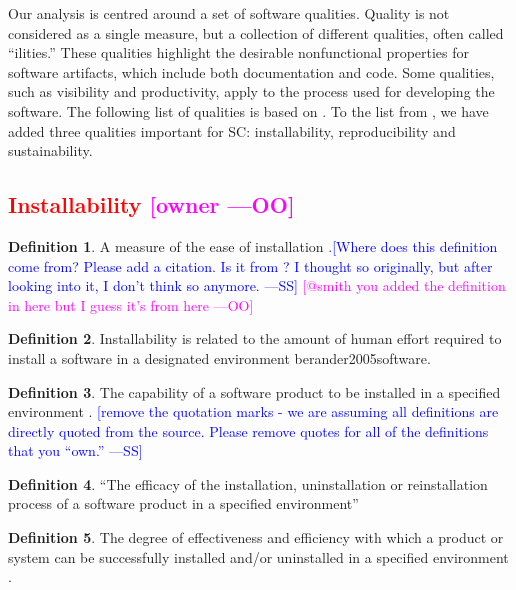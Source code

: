 \documentclass[letterpaper,cleveref]{lipics-v2019}
\newcommand{\authornote}[3]{\textcolor{#1}{[#3 ---#2]}}
\newcommand{\authornote}[3]{}
\newcommand{\wss}[1]{\authornote{blue}{SS}{#1}} %
\newcommand{\oo}[1]{\authornote{magenta}{OO}{#1}} %
\newcommand{\notdone}[1]{\textcolor{red}{#1}}
\theoremstyle{definition}
\newtheorem{defn}{Definition}
\begin{document}
Our analysis is centred around a set of software qualities.  Quality is not
considered as a single measure, but a collection of different qualities, often
called ``ilities.''  These qualities highlight the desirable nonfunctional
properties for software artifacts, which include both documentation and
code. Some qualities, such as visibility and productivity, apply to the process
used for developing the software. The following list of qualities is based on
\cite{GhezziEtAl2003}. To the list from \cite{GhezziEtAl2003}, we have added
three qualities important for SC: installability, reproducibility and
sustainability.

\subsection{\notdone{Installability} \oo{owner}}

\begin{defn}
	A measure of the ease of installation \citep{smith2015comparing}.\wss{Where
	does this definition come from? Please add a citation.  Is it from
	\citet{McCallEtAl1977}? I thought so originally, but after looking into it, I
	don't think so anymore.}
	\oo{@smith you added the definition in here but I guess it's from here}
\end{defn}

\begin{defn}
	Installability is related to the amount of human effort required to install a
	software in a designated environment \citep{iso2001iec}
		{ berander2005software}.
\end{defn}

\begin{defn}
	The capability of a software product to be installed in a specified
	environment \citep{berander2005software}.  \wss{remove the quotation marks -
		we are assuming all definitions are directly quoted from the source.  Please
		remove quotes for all of the definitions that you ``own.''} 
\end{defn}

\begin{defn} \label{InstallabilityDefnSelected1}
	``The efficacy of the installation, uninstallation or reinstallation process
	of a software product in a specified environment'' \citep{iso201017043}
\end{defn}

\begin{defn}
	The degree of effectiveness and efficiency with which a product or system can
	be successfully installed and/or uninstalled in a specified environment
	\citep{ISO/IEC25010}.
\end{defn}
\end{document}
